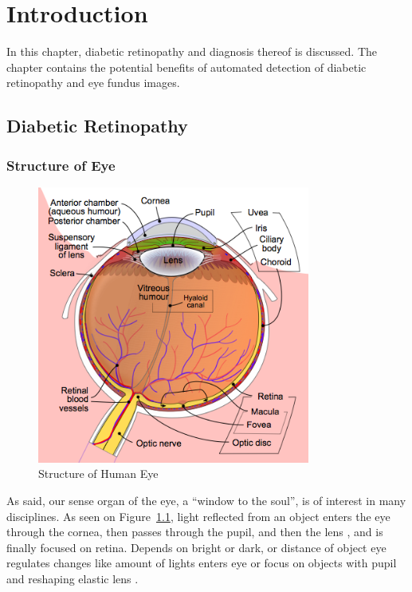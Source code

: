 \chapter{Introduction}
\label{intro}

In this chapter, diabetic retinopathy and diagnosis thereof is discussed. The chapter contains the potential benefits of automated detection of diabetic retinopathy and eye fundus images.

\section{Diabetic Retinopathy}


\subsection{Structure of Eye}

\begin{figure}[t]
\centering
\includegraphics[width=0.8\textwidth]{Figures/structure_of_eye}
\caption{Structure of Human Eye \citep[from][]{WikipediaEN:AFM}}
\label{structureOfEye}
\end{figure}

As \citet{hughes2004anatomy} said, our sense organ of the eye, a ``window to the soul'', is of interest in many disciplines. As seen on Figure~\ref{structureOfEye}, light reflected from an object enters the eye through the cornea, then passes through the pupil, and then the lens \citep{falt2012modern}, and is finally focused on retina. Depends on bright or dark, or distance of object eye regulates changes like amount of lights enters eye or focus on objects with pupil and reshaping elastic lens \citep{kauppi2010eye}.


